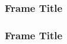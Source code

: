 \documentclass[t]{beamer}
\begin{document}
    \begin{frame}
        \frametitle{Frame Title}
    \end{frame}

    \begin{frame}
        \frametitle{Frame Title}
    \end{frame} 
\end{document}
